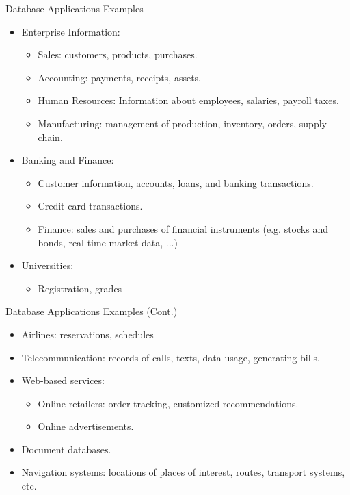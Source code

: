 \documentclass{beamer}
\begin{document}
\begin{frame}{Database Applications Examples}
\begin{itemize}
    \item Enterprise Information:
    \begin{itemize}
        \item Sales: customers, products, purchases.
        \item Accounting: payments, receipts, assets.
        \item Human Resources: Information about employees, salaries, payroll taxes.
        \item Manufacturing: management of production, inventory, orders, supply chain.
    \end{itemize}
    \item Banking and Finance:
    \begin{itemize}
        \item Customer information, accounts, loans, and banking transactions.
        \item Credit card transactions.
        \item Finance: sales and purchases of financial instruments (e.g. stocks and bonds, real-time market data, ...)
    \end{itemize}
    \item Universities:
    \begin{itemize}
        \item Registration, grades
    \end{itemize}
\end{itemize}
\end{frame}

\begin{frame}{Database Applications Examples (Cont.)}
    \begin{itemize}
        \item Airlines: reservations, schedules
        \item Telecommunication: records of calls, texts, data usage, generating bills.
        \item Web-based services:
        \begin{itemize}
            \item Online retailers: order tracking, customized recommendations.
            \item Online advertisements.
        \end{itemize}
        \item Document databases.
        \item Navigation systems: locations of places of interest, routes, transport systems, etc.
    \end{itemize}
\end{frame}
\end{document}

